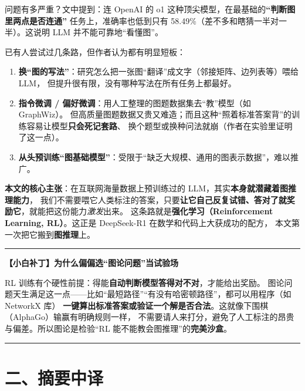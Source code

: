 \documentclass[11pt,UTF8,fontset=fandol]{ctexart}
\newenvironment{tip}[1]{%
  \par\smallskip\noindent\rule{\linewidth}{0.4pt}\par\nobreak
  \noindent\textbf{【小白补丁】#1}\par\nobreak\noindent\ignorespaces
}{%
  \par\noindent\rule{\linewidth}{0.4pt}\par\smallskip
}
\begin{document}
问题有多严重？文中提到：连 OpenAI 的 o1 这种顶尖模型，在最基础的\textbf{“判断图里两点是否连通”}
任务上，准确率也低到只有 58.49\%（差不多和瞎猜一半对一半）。这说明 LLM 并不能可靠地“看懂图”。

已有人尝试过几条路，但作者认为都有明显短板：

\begin{enumerate}[leftmargin=2em]
  \item \textbf{换“图的写法”}：研究怎么把一张图“翻译”成文字（邻接矩阵、边列表等）喂给 LLM，
        但提升很有限，没有哪种写法在所有任务上都最好。
  \item \textbf{指令微调 / 偏好微调}：用人工整理的图题数据集去“教”模型（如 GraphWiz）。
        但高质量图题数据又贵又难造；而且这种“照着标准答案背”的训练容易让模型\textbf{只会死记套路}、
        换个题型或换种问法就崩（作者在实验里证明了这一点）。
  \item \textbf{从头预训练“图基础模型”}：受限于“缺乏大规模、通用的图表示数据”，难以推广。
\end{enumerate}

\textbf{本文的核心主张}：在互联网海量数据上预训练过的 LLM，其实\textbf{本身就潜藏着图推理能力}，
我们不需要喂它人类标注的答案，只要\textbf{让它自己反复试错、答对了就奖励它}，就能把这份能力\emph{激发}出来。
这条路就是\textbf{强化学习（Reinforcement Learning, RL）}。这正是 DeepSeek-R1 在数学和代码上大获成功的配方，
本文第一次把它搬到\textbf{图推理}上。

\begin{tip}{为什么偏偏选“图论问题”当试验场}
RL 训练有个硬性前提：得能\textbf{自动判断模型答得对不对}，才能给出奖励。
图论问题天生满足这一点——比如“最短路径”“有没有哈密顿路径”，都可以用程序（如 NetworkX 库）
\textbf{一键算出标准答案或验证一个解是否合法}。这就像下围棋（AlphaGo）输赢有明确规则一样，
不需要请人来打分，避免了人工标注的昂贵与偏差。所以图论是检验“RL 能不能教会图推理”的\textbf{完美沙盒}。
\end{tip}

\section{二、摘要中译}
\end{document}
